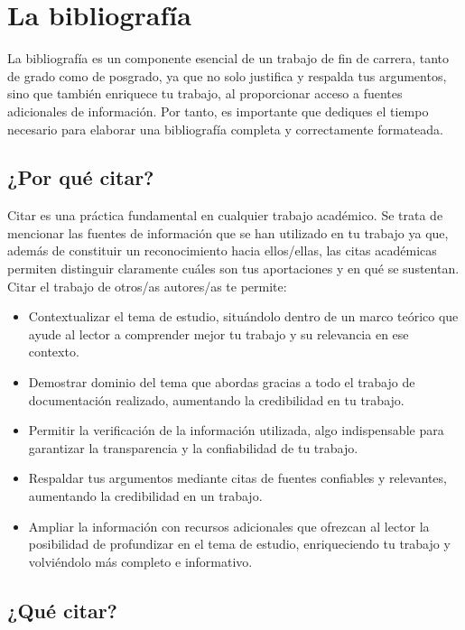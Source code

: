 \chapter{La bibliografía\label{cap:bibliografia}} %

La bibliografía es un componente esencial de un trabajo de fin de carrera, tanto de grado como de posgrado, ya que no solo justifica y respalda tus argumentos, sino que también enriquece tu trabajo, al proporcionar acceso a fuentes adicionales de información. Por tanto, es importante que dediques el tiempo necesario para elaborar una bibliografía completa y correctamente formateada.

\section{¿Por qué citar?}

Citar es una práctica fundamental en cualquier trabajo académico. Se trata de mencionar las fuentes de información que se han utilizado en tu trabajo ya que, además de constituir un reconocimiento hacia ellos/ellas, las citas académicas permiten distinguir claramente cuáles son tus aportaciones y en qué se sustentan. Citar el trabajo de otros/as autores/as te permite:

\begin{itemize}
    \item Contextualizar el tema de estudio, situándolo dentro de un marco teórico que ayude al lector a comprender mejor tu trabajo y su relevancia en ese contexto.
    \item Demostrar dominio del tema que abordas gracias a todo el trabajo de documentación realizado, aumentando la credibilidad en tu trabajo.
    \item Permitir la verificación de la información utilizada, algo indispensable para  garantizar la transparencia y la confiabilidad de tu trabajo.
    \item Respaldar tus argumentos mediante citas de fuentes confiables y relevantes, aumentando la credibilidad en un trabajo.
    \item Ampliar la información con recursos adicionales que ofrezcan al lector la posibilidad de profundizar en el tema de estudio, enriqueciendo tu trabajo y volviéndolo más completo e informativo.
\end{itemize}

\section{¿Qué citar?}

